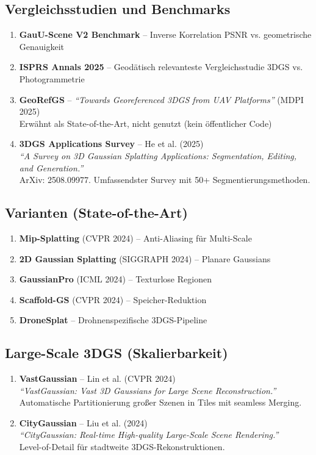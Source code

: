 \documentclass[11pt, a4paper]{article}
\begin{document}
\subsection{Vergleichsstudien und Benchmarks}
\begin{enumerate}[noitemsep, start=6]
    \item \textbf{GauU-Scene V2 Benchmark} -- Inverse Korrelation PSNR vs. geometrische Genauigkeit
    \item \textbf{ISPRS Annals 2025} -- Geod\"atisch relevanteste Vergleichsstudie 3DGS vs. Photogrammetrie
    \item \textbf{GeoRefGS} -- \textit{``Towards Georeferenced 3DGS from UAV Platforms''} (MDPI 2025)\\
    Erw\"ahnt als State-of-the-Art, nicht genutzt (kein \"offentlicher Code)
    \item \textbf{3DGS Applications Survey} -- He et al. (2025)\\
    \textit{``A Survey on 3D Gaussian Splatting Applications: Segmentation, Editing, and Generation.''}\\
    ArXiv: 2508.09977. Umfassendster Survey mit 50+ Segmentierungsmethoden.
\end{enumerate}

\subsection{Varianten (State-of-the-Art)}
\begin{enumerate}[noitemsep, start=9]
    \item \textbf{Mip-Splatting} (CVPR 2024) -- Anti-Aliasing f\"ur Multi-Scale
    \item \textbf{2D Gaussian Splatting} (SIGGRAPH 2024) -- Planare Gaussians
    \item \textbf{GaussianPro} (ICML 2024) -- Texturlose Regionen
    \item \textbf{Scaffold-GS} (CVPR 2024) -- Speicher-Reduktion
    \item \textbf{DroneSplat} -- Drohnenspezifische 3DGS-Pipeline
\end{enumerate}

\subsection{Large-Scale 3DGS (Skalierbarkeit)}
\begin{enumerate}[noitemsep, start=14]
    \item \textbf{VastGaussian} -- Lin et al. (CVPR 2024)\\
    \textit{``VastGaussian: Vast 3D Gaussians for Large Scene Reconstruction.''}\\
    Automatische Partitionierung gro\ss er Szenen in Tiles mit seamless Merging.
    \item \textbf{CityGaussian} -- Liu et al. (2024)\\
    \textit{``CityGaussian: Real-time High-quality Large-Scale Scene Rendering.''}\\
    Level-of-Detail f\"ur stadtweite 3DGS-Rekonstruktionen.
\end{enumerate}
\end{document}
